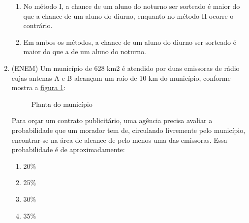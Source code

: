 \begin{enumerate}
\begin{enumerate}
\item {} 
No método I, a chance de um aluno do noturno ser sorteado é maior do que a chance de um aluno do diurno, enquanto no método II ocorre o contrário.

\item {} 
Em ambos os métodos, a chance de um aluno do diurno ser sorteado é maior do que a de um aluno do noturno.

\end{enumerate}

\item (ENEM) Um município de 628 km2 é atendido por duas emissoras de rádio cujas antenas A e B alcançam um raio de 10 km do município, conforme mostra a \hyperref[municipio]{figura \ref{municipio}}:
\begin{figure}[H]
\centering

\caption{Planta do município}
\label{municipio}
\end{figure}

Para orçar um contrato publicitário, uma agência precisa avaliar a probabilidade que um morador tem de, circulando livremente pelo município, encontrar-se na área de alcance de pelo menos uma das emissoras. Essa probabilidade é de aproximadamente:
\begin{enumerate}
\item {} 
20\%

\item {} 
25\%

\item {} 
30\%

\item {} 
35\%


\end{enumerate}
\end{enumerate}

